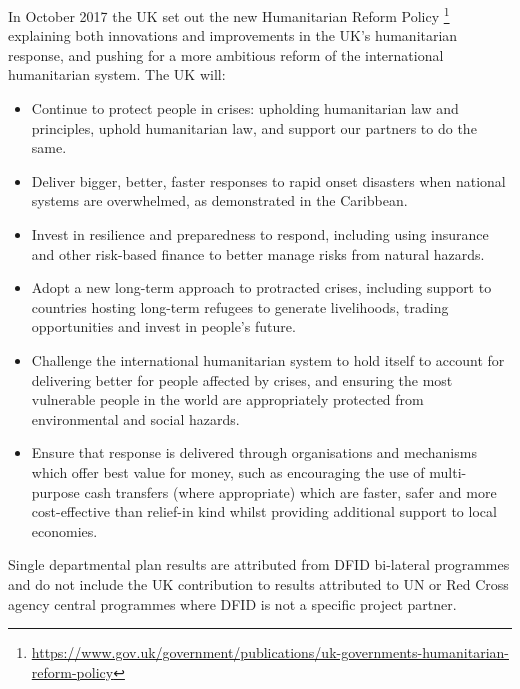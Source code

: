 In October 2017 the UK set out the new Humanitarian Reform Policy \footnote{\href{https://www.gov.uk/government/publications/uk-governments-humanitarian-reform-policy}{https://www.gov.uk/government/publications/uk-governments-humanitarian-reform-policy}} explaining both innovations and improvements in the UK's humanitarian response, and pushing for a more ambitious reform of the international humanitarian system. %
The UK will:
\begin{itemize}
\item Continue to protect people in crises: upholding humanitarian law and principles, uphold humanitarian law, and support our partners to do the same.
\item Deliver bigger, better, faster responses to rapid onset disasters when national systems are overwhelmed, as demonstrated in the Caribbean.
\item Invest in resilience and preparedness to respond, including using insurance and other risk-based finance to better manage risks from natural hazards.
\item Adopt a new long-term approach to protracted crises, including support to countries hosting long-term refugees to generate livelihoods, trading opportunities and invest in people's future.
\item Challenge the international humanitarian system to hold itself to account for delivering better for people affected by crises, and ensuring the most vulnerable people in the world are appropriately protected from environmental and social hazards.
\item Ensure that response is delivered through organisations and mechanisms which offer best value for money, such as encouraging the use of multi-purpose cash transfers (where appropriate) which are faster, safer and more cost-effective than relief-in kind whilst providing additional support to local economies.
\end{itemize}

Single departmental plan results are attributed from DFID bi-lateral programmes and do not include the UK contribution to results attributed to UN or Red Cross agency central programmes where DFID is not a specific project partner. %


\newpage
